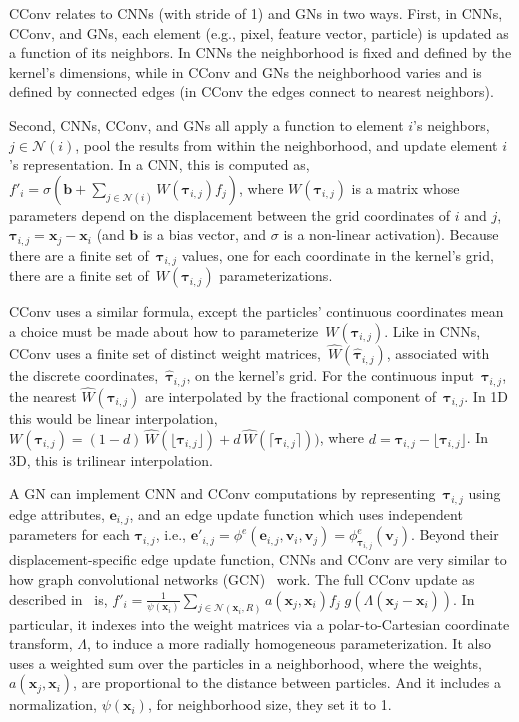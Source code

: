 \documentclass{article}
\begin{document}
CConv relates to CNNs (with stride of 1) and GNs in two ways. First, in CNNs, CConv, and GNs, each element (e.g., pixel, feature vector, particle) is updated as a function of its neighbors. In CNNs the neighborhood is fixed and defined by the kernel's dimensions, while in CConv and GNs the neighborhood varies and is defined by connected edges (in CConv the edges connect to nearest neighbors).

Second, CNNs, CConv, and GNs all apply a function to element $i$'s neighbors, $j \in \mathcal{N}(i)$, pool the results from within the neighborhood, and update element $i$'s representation. In a CNN, this is computed as,~$f'_i = \sigma\left(\mathbf{b} + \sum_{j \in \mathcal{N}(i)} W(\bm{\tau}_{i,j}) f_j \right)$, where $W(\bm{\tau}_{i,j})$ is a matrix whose parameters depend on the displacement between the grid coordinates of $i$ and $j$, $\bm{\tau}_{i,j} = \mathbf{x}_j - \mathbf{x}_i$ (and $\mathbf{b}$ is a bias vector, and $\sigma$ is a non-linear activation). Because there are a finite set of~$\bm{\tau}_{i,j}$ values, one for each coordinate in the kernel's grid, there are a finite set of~$W(\bm{\tau}_{i,j})$ parameterizations.

%
%
%
%
CConv uses a similar formula, except the particles' continuous coordinates mean a choice must be made about how to parameterize~$W(\bm{\tau}_{i,j})$. 
%
Like in CNNs, CConv uses a finite set of distinct weight matrices,~$\hat{W}(\hat{\bm{\tau}}_{i,j})$, associated with the discrete coordinates,~$\hat{\bm{\tau}}_{i,j}$, on the kernel's grid. For the continuous input~$\bm{\tau}_{i,j}$, the nearest $\hat{W}(\bm{\tau}_{i,j})$ are interpolated by the fractional component of~$\bm{\tau}_{i,j}$. In 1D this would be linear interpolation, $W(\bm{\tau}_{i,j}) = (1 - d)\, \hat{W}(\lfloor\bm{\tau}_{i,j}\rfloor) + d\, \hat{W}(\lceil\bm{\tau}_{i,j}\rceil))$, where $d = \bm{\tau}_{i,j} - \lfloor\bm{\tau}_{i,j}\rfloor$. In 3D, this is trilinear interpolation. 

%

%

A GN can implement CNN and CConv computations by representing~$\bm{\tau}_{i,j}$ using edge attributes, $\mathbf{e}_{i,j}$, and an edge update function which uses independent parameters for each $\bm{\tau}_{i,j}$, i.e., $\mathbf{e}'_{i,j} = \phi^e(\mathbf{e}_{i,j}, \mathbf{v}_i, \mathbf{v}_j) = \phi^e_{\bm{\tau}_{i,j}}(\mathbf{v}_j)$. 
%
%
%
Beyond their displacement-specific edge update function, CNNs and CConv are very similar to how graph convolutional networks (GCN)~\cite{kipf2016semi} work.
%
The full CConv update as described in~\citet{ummenhofer2020lagrangian} is,
$f'_i = \frac{1}{\psi\left(\mathbf{x}_i\right)} \sum_{j \in \mathcal{N}\left(\mathbf{x}_i, R\right)}  a\left(\mathbf{x}_j, \mathbf{x}_i\right) f_j \; g\left(\Lambda\left(\mathbf{x}_j - \mathbf{x}_i\right)\right)$.
%
In particular, it indexes into the weight matrices via a polar-to-Cartesian coordinate transform, $\Lambda$, to induce a more radially homogeneous parameterization. It also uses a weighted sum over the particles in a neighborhood, where the weights, $a(\mathbf{x}_j, \mathbf{x}_i)$, are proportional to the distance between particles. And it includes a normalization, $\psi(\mathbf{x}_i)$, for neighborhood size, they set it to 1. 
\end{document}
